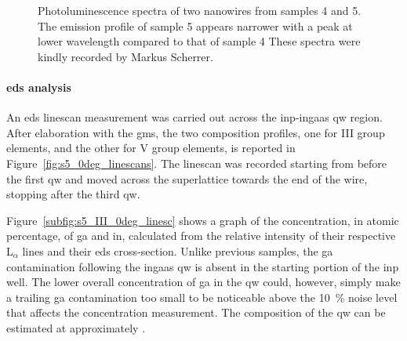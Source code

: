 \begin{figure}
    \centering
    \caption[Photoluminescence spectra of two nanowires from samples 4 and 5.]{Photoluminescence spectra of two nanowires from samples 4 and 5. The emission profile of sample 5 appears narrower with a peak at lower wavelength compared to that of sample 4 These spectra were kindly recorded by Markus Scherrer.}
    \label{fig:s5_pl}
\end{figure}

\paragraph{\acs{eds} analysis} An \acs{eds} linescan measurement was carried out across the \acs{inp}-\acs{ingaas} \acl{qw} region. After elaboration with the \acf{gms}, the two composition profiles, one for III group elements, and the other for V group elements, is reported in Figure~\ref{fig:s5_0deg_linescans}. The linescan was recorded starting from before the first \acl{qw} and moved across the superlattice towards the end of the wire, stopping after the third \acl{qw}.

Figure~\ref{subfig:s5_III_0deg_linesc} shows a graph of the concentration, in atomic percentage, of \acl{ga} and \acl{in}, calculated from the relative intensity of their respective L\(_\alpha\) lines and their \acs{eds} cross-section. Unlike previous samples, the \acl{ga} contamination following the \acs{ingaas} \acl{qw} is absent in the starting portion of the \acs{inp} well. The lower overall concentration of \acl{ga} in the \acl{qw} could, however, simply make a trailing \acl{ga} contamination too small to be noticeable above the \qty{10}{\%} noise level that affects the concentration measurement. The composition of the \acl{qw} can be estimated at approximately .

